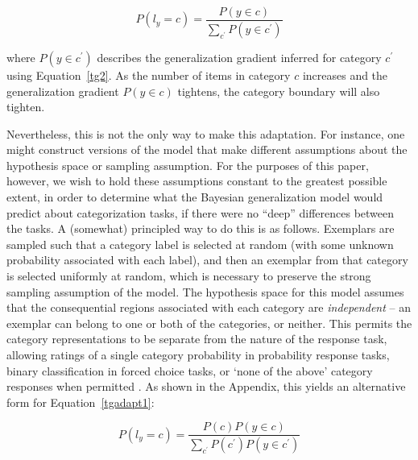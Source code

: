 \documentclass[doc,apacite]{apa6}
\begin{document}
\begin{equation}
\label{tgadapt1}
P(l_y = c) =  \frac{P(y \in c)}{\sum_{c^\prime} P(y \in c^\prime)}
\end{equation}

\noindent
where $P(y \in c^\prime)$ describes the generalization gradient inferred for category $c^\prime$ using Equation~\ref{tg2}. As the number of items in category $c$ increases and the generalization gradient $P(y \in c)$ tightens, the category boundary will also tighten.

Nevertheless, this is not the only way to make this adaptation. For instance, one might construct versions of the model that make different assumptions about the hypothesis space or sampling assumption. For the purposes of this paper, however, we wish to hold these assumptions constant to the greatest possible extent, in order to determine what the Bayesian generalization model would predict about categorization tasks, if there were no ``deep'' differences between the tasks. A (somewhat) principled way to do this is as follows. Exemplars are sampled such that a category label is selected at random (with some unknown probability associated with each label), and then an exemplar from that category is selected uniformly at random, which is necessary to preserve the strong sampling assumption of the model. The hypothesis space for this model assumes that the consequential regions associated with each category are {\it independent} -- an exemplar can belong to one or both of the categories, or neither. This permits the category representations to be separate from the nature of the response task, allowing ratings of a single category probability in {\sc probability} response tasks, binary classification in {\sc forced choice} tasks, or `none of the above' category responses when permitted \cite{navarrosubmittednone}. 
As shown in the Appendix, this yields an alternative form for Equation~\ref{tgadapt1}:

\begin{equation}
\label{tgadapt2}
P(l_y = c) =  \frac{P(c) P(y \in c)}{\sum_{c^\prime} P(c^\prime) P(y \in c^\prime)}
\end{equation}
\end{document}
